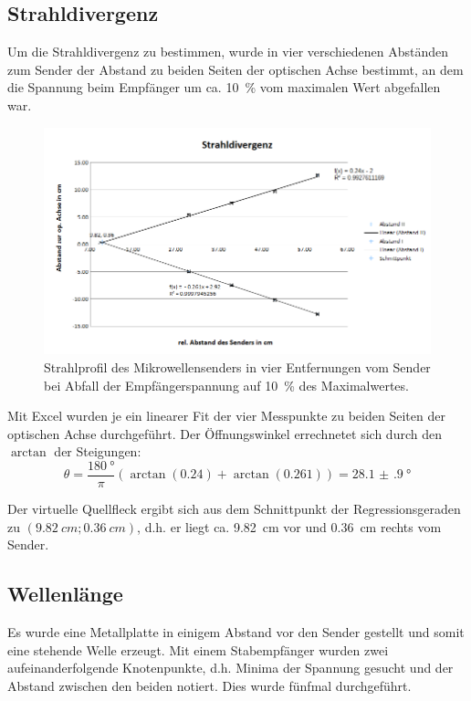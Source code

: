 \subsection{Strahldivergenz}
Um die Strahldivergenz zu bestimmen, wurde in vier verschiedenen Abständen zum Sender der Abstand zu beiden Seiten der optischen Achse bestimmt, an dem die Spannung beim Empfänger um ca. \SI{10}{\percent} vom maximalen Wert abgefallen war.
\begin{figure}[h]
\centering
\includegraphics[width=\linewidth]{res/Nr2neu.png}
\caption{Strahlprofil des Mikrowellensenders in vier Entfernungen vom Sender bei Abfall der Empfängerspannung auf \SI{10}{\percent} des Maximalwertes.}
\label{fig:strahldiv}
\end{figure}
Mit Excel wurden je ein linearer Fit der vier Messpunkte zu beiden Seiten der optischen Achse durchgeführt. Der Öffnungswinkel errechnetet sich durch den $\arctan$ der Steigungen:
\begin{equation}
\theta=\frac{\SI{180}{\degree}}{\pi}(\arctan(\num{0.24})+\arctan(\num{0.261}))=\SI{28.1(9)}{\degree}
\label{eq:strahldiv}
\end{equation}

Der virtuelle Quellfleck ergibt sich aus dem Schnittpunkt der Regressionsgeraden zu $(\SI{9.82}{cm};\SI{0.36}{cm})$, d.h. er liegt ca. \SI{9.82}{cm} vor und \SI{0.36}{cm} rechts vom Sender.

\subsection{Wellenlänge}
Es wurde eine Metallplatte in einigem Abstand vor den Sender gestellt und somit eine stehende Welle erzeugt. Mit einem Stabempfänger wurden zwei aufeinanderfolgende Knotenpunkte, d.h. Minima der Spannung gesucht und der Abstand zwischen den beiden notiert. Dies wurde fünfmal durchgeführt.

